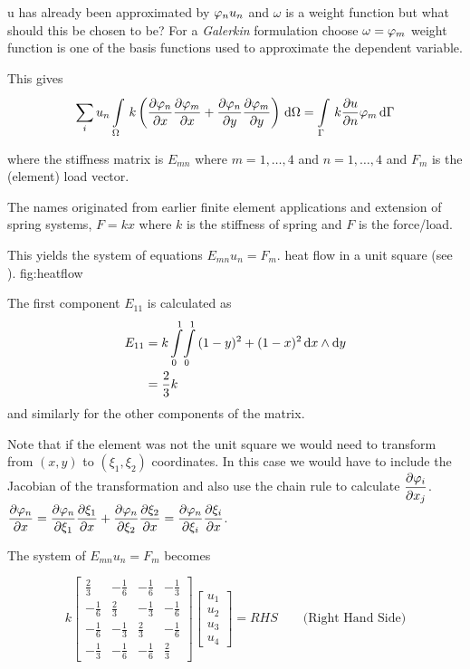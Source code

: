 u has already been approximated by $ \varphi_{n} u_{n}$ and $\omega$ is a weight 
function but what should this be chosen to be?
For a \emph{Galerkin} formulation choose $\omega =  \varphi_{m} $
\ie weight function is one of the basis functions used to approximate the
dependent variable.

This gives
\begin{equation}
  \sum_{i}u_{n}
\goneint{k\pbrac{ \delby{\lbfnsymb{n}}{x}\delby{\lbfnsymb{m}}{x}
      +\delby{\lbfnsymb{n}}{y}\delby{\lbfnsymb{m}}{y} }}{\Omega} 
= \goneint{k\delby{u}{n}\lbfnsymb{m}}{\Gamma}
\end{equation}

where the stiffness matrix is $E_{mn}$ where $m=1,\dots,4$ and $n=1,\ldots,4$
and $F_{m}$ is the (element) load vector. 

The names originated from earlier finite element applications and extension of spring
systems, \ie $F=kx$ where $k$ is the stiffness of spring and $F$ is the force/load.

This yields the system of equations $E_{mn}u_{n} = F_{m}$. \eg heat flow in a
unit square (see ).
   {fig:heatflow}

The first component $E_{11}$ is calculated as
\begin{align*}
E_{11} &= k   \displaystyle\int\limits_{0}^{1} \! \displaystyle\int\limits_{0}^{1} \, (1-y)^{2}+(1-x)^{2} \,  \mathrm{d}   x\wedge  \mathrm{d}   y \\ 
       &= \dfrac{2}{3}k
\end{align*}
and similarly for the other components of the matrix.

Note that if the element was not the unit square we would need to transform
from $(x,y)$ to $(\xi_{1},\xi_{2})$ coordinates. In this case we would have to
include the Jacobian of the transformation and also use the chain rule to
calculate $ \dfrac{\partial  \varphi_{i} }{\partial x_{j}} $. \eg 
$ \dfrac{\partial  \varphi_{n} }{\partial x}  = 
    \dfrac{\partial  \varphi_{n} }{\partial \xi_{1}}  \dfrac{\partial \xi_{1}}{\partial x}  + 
    \dfrac{\partial  \varphi_{n} }{\partial \xi_{2}}  \dfrac{\partial \xi_{2}}{\partial x} 
   = \dfrac{\partial  \varphi_{n} }{\partial \xi_{i}}  \dfrac{\partial \xi_{i}}{\partial x} $.

The system of $E_{mn}u_{n}=F_{m}$ becomes

\begin{equation}
  k
  \begin{bmatrix}
    \frac{2}{3} & -\frac{1}{6} & -\frac{1}{6} & -\frac{1}{3} \\
    -\frac{1}{6} & \frac{2}{3} & -\frac{1}{3} & -\frac{1}{6} \\
    -\frac{1}{6} & -\frac{1}{3} & \frac{2}{3} & -\frac{1}{6} \\
    -\frac{1}{3} & -\frac{1}{6} & -\frac{1}{6} & \frac{2}{3}
  \end{bmatrix}
  \begin{bmatrix}
    u_{1} \\
    u_{2} \\
    u_{3} \\
    u_{4} 
  \end{bmatrix}
  = RHS \qquad \text{(Right Hand Side)}
\end{equation}

